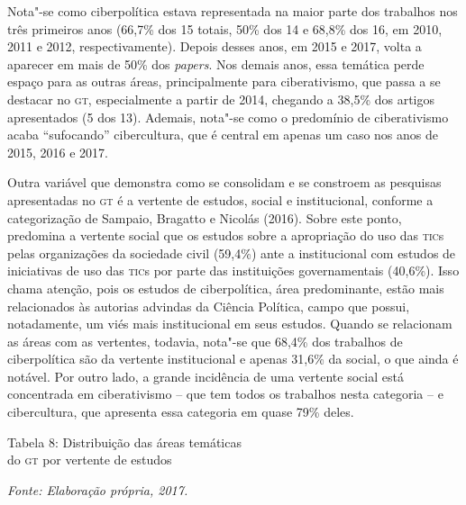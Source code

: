 Nota"-se como ciberpolítica estava representada na maior parte dos
trabalhos nos três primeiros anos (66,7\% dos 15 totais, 50\% dos 14 e
68,8\% dos 16, em 2010, 2011 e 2012, respectivamente). Depois desses
anos, em 2015 e 2017, volta a aparecer em mais de 50\% dos
\emph{papers}. Nos demais anos, essa temática perde espaço para as
outras áreas, principalmente para ciberativismo, que passa a se destacar
no \textsc{gt}, especialmente a partir de 2014, chegando a 38,5\% dos artigos
apresentados (5 dos 13). Ademais, nota"-se como o predomínio de
ciberativismo acaba ``sufocando'' cibercultura, que é central em apenas
um caso nos anos de 2015, 2016 e 2017.

Outra variável que demonstra como se consolidam e se constroem as
pesquisas apresentadas no \textsc{gt} é a vertente de estudos, social e
institucional, conforme a categorização de Sampaio, Bragatto e Nicolás
(2016). Sobre este ponto, predomina a vertente social que os estudos
sobre a apropriação do uso das \textsc{tic}s pelas organizações da sociedade
civil (59,4\%) ante a institucional com estudos de iniciativas de uso
das \textsc{tic}s por parte das instituições governamentais (40,6\%). Isso chama
atenção, pois os estudos de ciberpolítica, área predominante, estão mais
relacionados às autorias advindas da Ciência Política, campo que possui,
notadamente, um viés mais institucional em seus estudos. Quando se
relacionam as áreas com as vertentes, todavia, nota"-se que 68,4\% dos
trabalhos de ciberpolítica são da vertente institucional e apenas 31,6\%
da social, o que ainda é notável. Por outro lado, a grande incidência de
uma vertente social está concentrada em ciberativismo -- que tem todos
os trabalhos nesta categoria -- e cibercultura, que apresenta essa
categoria em quase 79\% deles.

\pagebreak

\begin{center}
Tabela 8: Distribuição das áreas temáticas\\ do \textsc{gt} por vertente de estudos\bigskip


{\footnotesize\emph{Fonte: Elaboração própria, 2017.}}
\end{center}

